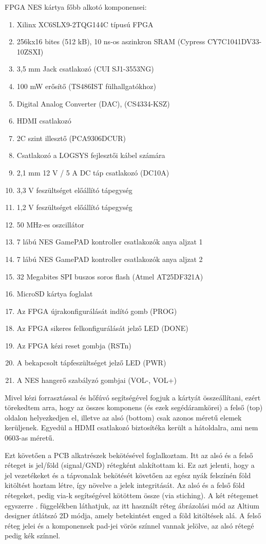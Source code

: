 	FPGA NES kártya főbb alkotó komponensei:
	\begin{enumerate}
		\item Xilinx XC6SLX9-2TQG144C típusú FPGA
		\item 256kx16 bites (512 kB), 10 ns-os aszinkron SRAM (Cypress CY7C1041DV33-10ZSXI)
		\item 3,5 mm Jack csatlakozó (CUI SJ1-3553NG)
		\item 100 mW erősítő (TS486IST fülhallgatókhoz)
		\item Digital Analog Converter (DAC), (CS4334-KSZ)
		\item HDMI csatlakozó
		\item 2C szint illesztő (PCA9306DCUR)
		\item Csatlakozó a LOGSYS fejlesztői kábel számára
		\item 2,1 mm 12 V / 5 A DC táp csatlakozó (DC10A)
		\item 3,3 V feszültséget előállító tápegység
		\item 1,2 V feszültséget előállító tápegység
		\item 50 MHz-es oszcillátor 
		\item 7 lábú NES GamePAD kontroller csatlakozók anya aljzat 1
		\item 7 lábú NES GamePAD kontroller csatlakozók anya aljzat 2
		\item 32 Megabites SPI buszos soros flash (Atmel AT25DF321A)
		\item MicroSD kártya foglalat
		\item Az FPGA újrakonfigurálását indító gomb (PROG)
		\item Az FPGA sikeres felkonfigurálását jelző LED (DONE)
		\item Az FPGA kézi reset gombja (RSTn)
		\item A bekapcsolt tápfeszültséget jelző LED (PWR)
		\item A NES hangerő szabályzó gombjai (VOL-, VOL+)
	\end{enumerate}
	
	Mivel kézi forrasztással és hőfúvó segítségével fogjuk a kártyát összeállítani, ezért törekedtem arra, hogy az összes komponens (és ezek segédáramkörei) a felső (top) oldalon helyezkedjen el, illetve az alsó (bottom) csak azonos méretű elemek kerüljenek. Egyedül a HDMI csatlakozó biztosítéka került a hátoldalra, ami nem 0603-as méretű.
	
	Ezt követően a PCB alkatrészek bekötésével foglalkoztam. Itt az alsó és a felső réteget is jel/föld (signal/GND) rétegként alakítottam ki. Ez azt jelenti, hogy a jel vezetékeket és a tápvonalak bekötését követően az egész nyák felszínén föld kitöltést hoztam létre, így növelve a jelek integritását. Az alsó és a felső föld rétegeket, pedig via-k segítségével kötöttem össze (via stiching). A két rétegemet egyszerre . függelékben láthatjuk, az itt használt réteg ábrázolási mód az Altium designer átlátszó 2D módja, amely betekintést enged a föld kitöltések alá. A felső réteg jelei és a komponensek pad-jei vörös színnel vannak jelölve, az alsó rétegé pedig kék színnel.
	
